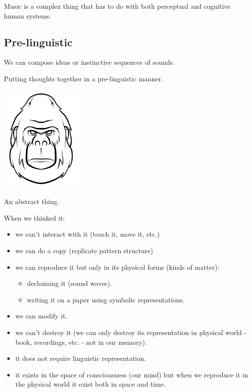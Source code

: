 Music is a complex thing that has to do with both perceptual and cognitive human systems.

\subsection{Pre-linguistic}\label{pre-linguistic}

We can compose ideas or instinctive sequences of sounds.

Putting thoughts together in a pre-linguistic manner.

\begin{center}
\includegraphics[scale=0.35]{../img/pensiero.png}
\end{center}

An abstract thing.

When we thinked it:

\begin{itemize}
\tightlist
\item we can't interact with it (touch it, move it, etc.)
\item we can do a copy (replicate pattern structure)
\item we can reproduce it but only in its physical forms (kinds of matter):
   \begin{itemize}
   \tightlist
   \item declaiming it (sound waves).
   \item writing it on a paper using symbolic representations.
   \end{itemize}
\item we can modify it.
\item we can't destroy it (we can only destroy its representation in physical world - book, recordings, etc. - not in our memory).
\item it does not require linguistic representation.
\item it exists in the space of consciousness (our mind) but when we
  reproduce it in the physical world it exist both in space and time.
\end{itemize}

